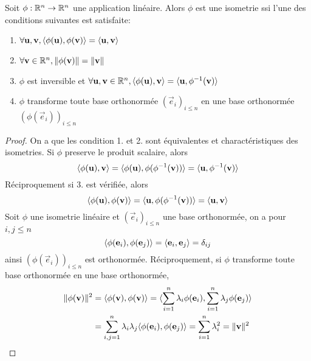 \begin{theorem}
	Soit $\phi: \mathbb{R}^n \to \mathbb{R}^n$ une application linéaire. Alors $\phi$ est une
	isometrie ssi l'une des conditions suivantes est satisfaite:
	\begin{enumerate}
		\item $\forall \mathbf{u}, \mathbf{v}, \langle \phi(\mathbf{u}), \phi(\mathbf{v}) \rangle
			= \langle \mathbf{u}, \mathbf{v} \rangle$
		\item $\forall \mathbf{v} \in \mathbb{R}^n, \|\phi(\mathbf{v})\| = \|\mathbf{v}\|$
		\item $\phi$ est inversible et $\forall \mathbf{u}, \mathbf{v} \in \mathbb{R}^n,
			\langle \phi(\mathbf{u}), \mathbf{v} \rangle = \langle \mathbf{u}, \phi^{-1}(\mathbf{v}) \rangle$
		\item $\phi$ transforme toute base orthonormée $(\vec{e}_i)_{i\leq n}$ en
			une base orthonormée $(\phi(\vec{e}_i))_{i\leq n}$
	\end{enumerate}
\end{theorem}

\begin{proof}
	On a que les condition 1. et 2. sont équivalentes et charactéristiques des
	isometries. Si $\phi$ preserve le produit scalaire, alors
	\begin{equation*}
		\langle \phi(\mathbf{u}), \mathbf{v} \rangle =
		\langle \phi(\mathbf{u}), \phi(\phi^{-1}(\mathbf{v})) \rangle =
		\langle \mathbf{u}, \phi^{-1}(\mathbf{v}) \rangle
	\end{equation*}
	Réciproquement si 3. est vérifiée, alors
	\begin{equation*}
		\langle \phi(\mathbf{u}), \phi(\mathbf{v}) \rangle =
		\langle \mathbf{u}, \phi(\phi^{-1}(\mathbf{v})) \rangle =
		\langle \mathbf{u}, \mathbf{v} \rangle
	\end{equation*}
	Soit $\phi$ une isometrie linéaire et $(\vec{e}_i)_{i\leq n}$ une base
	orthonormée, on a pour $i, j \leq n$
	\begin{equation*}
		\langle \phi(\mathbf{e}_i), \phi(\mathbf{e}_j) \rangle = \langle \mathbf{e}_i, \mathbf{e}_j \rangle =
		\delta_{ij}
	\end{equation*}
	ainsi $(\phi(\vec{e}_i))_{i\leq n}$ est orthonormée. Réciproquement, si
	$\phi$ transforme toute base orthonormée en une base orthonormée,
	\begin{align*}
		\|\phi(\mathbf{v)}\|^2 &= \langle \phi(\mathbf{v}), \phi(\mathbf{v}) \rangle = 
		\langle \sum_{i=1}^n \lambda_i\phi(\mathbf{e}_i), \sum_{i=1}^n
		\lambda_j\phi(\mathbf{e}_j) \rangle\\
		&= \sum_{i,j=1}^n\lambda_i\lambda_j\langle \phi(\mathbf{e}_i), \phi(\mathbf{e}_j) \rangle
		= \sum_{i=1}^n\lambda_i^2 = \|\mathbf{v}\|^2
	\end{align*}
\end{proof}

